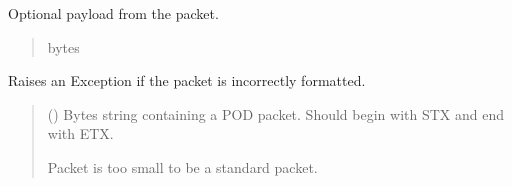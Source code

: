 \documentclass[letterpaper,10pt,english]{sphinxmanual}
\begin{document}
\begin{fulllineitems}
\begin{fulllineitems}
\begin{quote}
\begin{description}
\end{description}\end{quote}

\end{fulllineitems}


\begin{fulllineitems}
\label{\detokenize{PodApi.Packets:PodApi.Packets.Standard.PacketStandard.payload}}
\pysigstartsignatures
{}
\pysigstopsignatures
\sphinxAtStartPar
Optional payload from the packet.
\begin{quote}\begin{description}
\sphinxAtStartPar
bytes

\end{description}\end{quote}

\end{fulllineitems}


\begin{fulllineitems}
\label{\detokenize{PodApi.Packets:PodApi.Packets.Standard.PacketStandard.CheckIfPacketIsValid}}
\pysigstartsignatures
{}
\pysigstopsignatures
\sphinxAtStartPar
Raises an Exception if the packet is incorrectly formatted.
\begin{quote}\begin{description}
\sphinxAtStartPar
{} () \textendash{} Bytes string containing a POD packet. Should begin with STX and                 end with ETX.

\sphinxAtStartPar
{} \textendash{} Packet is too small to be a standard packet.

\end{description}\end{quote}


\end{fulllineitems}
\end{fulllineitems}
\end{document}
